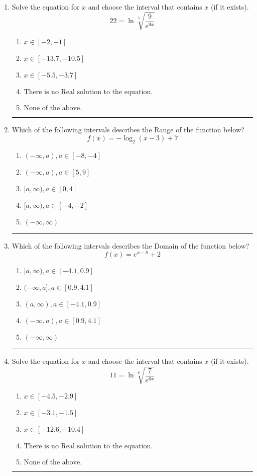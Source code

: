 \documentclass[14pt]{extbook}
\newcommand{\litem}[1]{\item#1\hspace*{-1cm}\rule{\textwidth}{0.4pt}}
\begin{document}
\begin{enumerate}
\litem{
 Solve the equation for $x$ and choose the interval that contains $x$ (if it exists).\[  22 = \ln{\sqrt[5]{\frac{9}{e^{9x}}}} \]\begin{enumerate}[label=\Alph*.]
\item \( x \in [-2, -1] \)
\item \( x \in [-13.7, -10.5] \)
\item \( x \in [-5.5, -3.7] \)
\item \( \text{There is no Real solution to the equation.} \)
\item \( \text{None of the above.} \)

\end{enumerate} }
\litem{
Which of the following intervals describes the Range of the function below?\[ f(x) = -\log_2{(x-3)}+7 \]\begin{enumerate}[label=\Alph*.]
\item \( (-\infty, a), a \in [-8, -4] \)
\item \( (-\infty, a), a \in [5, 9] \)
\item \( [a, \infty), a \in [0, 4] \)
\item \( [a, \infty), a \in [-4, -2] \)
\item \( (-\infty, \infty) \)

\end{enumerate} }
\litem{
Which of the following intervals describes the Domain of the function below?\[ f(x) = e^{x-8}+2 \]\begin{enumerate}[label=\Alph*.]
\item \( [a, \infty), a \in [-4.1, 0.9] \)
\item \( (-\infty, a], a \in [0.9, 4.1] \)
\item \( (a, \infty), a \in [-4.1, 0.9] \)
\item \( (-\infty, a), a \in [0.9, 4.1] \)
\item \( (-\infty, \infty) \)

\end{enumerate} }
\litem{
 Solve the equation for $x$ and choose the interval that contains $x$ (if it exists).\[  11 = \ln{\sqrt[6]{\frac{7}{e^{6x}}}} \]\begin{enumerate}[label=\Alph*.]
\item \( x \in [-4.5, -2.9] \)
\item \( x \in [-3.1, -1.5] \)
\item \( x \in [-12.6, -10.4] \)
\item \( \text{There is no Real solution to the equation.} \)
\item \( \text{None of the above.} \)


\end{enumerate}}
\end{enumerate}
\end{document}
